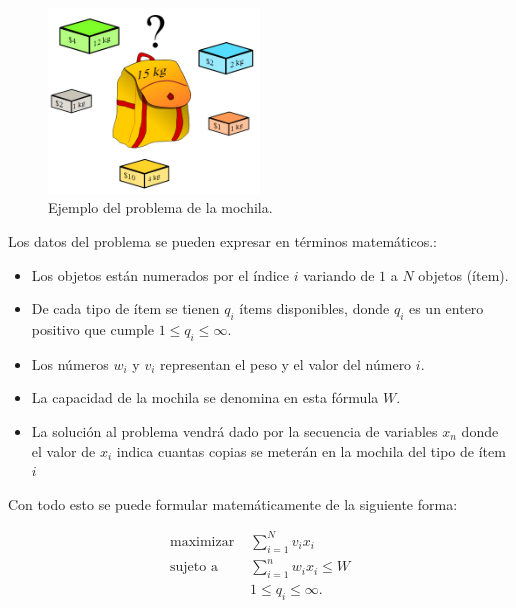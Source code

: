     \begin{figure}[hbtp]
        \centering
            \includegraphics[width=0.5\textwidth]{MarcoTeorico/Imagenes/imagen_mochila.png}
            \caption{Ejemplo del problema de la mochila.}      
            \label{fig:imagen_mochila}
    \end{figure}   
    
Los datos del problema se pueden expresar en términos matemáticos.:
\begin{itemize}
\item Los objetos están numerados por el índice $i$ variando de $1$ a $N$ objetos (ítem).
\item De cada tipo de ítem se tienen $q_i$ ítems disponibles, donde $q_i$ es un entero positivo que cumple $1\leq q_i\leq\infty$.
\item Los números $w_{i}$ y $v_{i}$ representan el peso y el valor del número $i$. 
\item La capacidad de la mochila se denomina en esta fórmula $W$.
\item La solución al problema vendrá dado por la secuencia de variables $x_{n}$ donde el valor de $x_{i}$ indica cuantas copias se meterán en la mochila del tipo de ítem ${i}$
\end{itemize}
Con todo esto se puede formular matemáticamente de la siguiente forma:

\begin{equation*}
\begin{aligned}
\text{maximizar } & \sum_{i=1}^N v_{i} x_{i} \\
\text{sujeto a }  & \sum_{i=1}^{n}  w_{i} x_{i} \leq W \\
                  & 1\leq q_i\leq\infty.
\end{aligned}
\end{equation*}